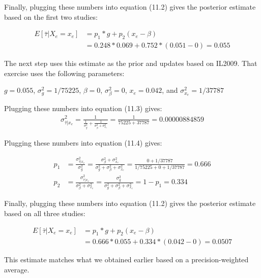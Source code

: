 \documentclass[11pt,notitlepage]{article}\usepackage[]{graphicx}\usepackage[]{color}
\begin{document}
\begin{enumerate}[a)]
Finally, plugging these numbers into equation (11.2) gives the posterior estimate based on the first two studies:

\begin{align*}
E[\bar{\tau}|X_e = x_e] &= p_1*g + p_2(x_e - \beta) \\
&= 0.248 * 0.069 +0.752 * (0.051-0) = 0.055
\end{align*}


The next step uses this estimate as the prior and updates based on IL2009.  That exercise uses the following parameters: 

$g=0.055$, $\sigma^2_g = 1/75225$, $\beta = 0$, $\sigma^2_{\beta} = 0$, $x_e = 0.042$, and $\sigma^2_{x_e} = 1/37787$

Plugging these numbers into equation (11.3) gives: 
 \begin{align*}
\sigma^2_{\bar{\tau}|x_e} = \frac{1}{\frac{1}{\sigma^2_g} + \frac{1}{\sigma^2_{\beta} + \sigma^2_{x_e}}} = \frac{1}{75225+37787 }= 0.00000884859
\end{align*}

Plugging these numbers into equation (11.4) gives: 
 
 \begin{align*}
p_1 &= \frac{\sigma^2_{\bar{\tau}|x_e}}{\sigma^2_g} = \frac{\sigma^2_{\beta} + \sigma^2_{x_e}}{\sigma^2_g +\sigma^2_{\beta} + \sigma^2_{x_e}} = \frac{0+1/37787}{1/75225+0+1/37787} = 0.666\\
p_2 &= \frac{\sigma^2_{\bar{\tau}|x_e}}{\sigma^2_{\beta} + \sigma^2_{x_e}} = \frac{\sigma^2_g}{\sigma^2_g +\sigma^2_{\beta} + \sigma^2_{x_e}} = 1 - p_1 = 0.334
\end{align*}
 
Finally, plugging these numbers into equation (11.2) gives the posterior estimate based on all three studies:

\begin{align*}
E[\bar{\tau}|X_e = x_e] &= p_1*g + p_2(x_e - \beta) \\
&= 0.666 * 0.055 +0.334 * (0.042-0) = 0.0507
\end{align*}

This estimate matches what we obtained earlier based on a precision-weighted average.



\end{enumerate}
\end{document}
